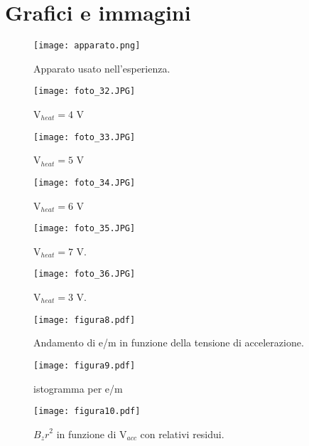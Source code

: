 \section{Grafici e immagini}

\begin{figure}[h]
	\centering
	\texttt{[image: apparato.png]}
	\caption{Apparato usato nell'esperienza.}
	\label{f:apparato}
\end{figure}
\begin{figure}[h]
	\centering
	\texttt{[image: foto\_32.JPG]}
	\caption{V$_{heat} = 4$ V}
	\label{f:figura_3}
\end{figure}
\begin{figure}[h]
	\centering
	\texttt{[image: foto\_33.JPG]}
	\caption{V$_{heat} = 5$ V}
           \label{f:figura_4}
\end{figure}
\begin{figure}[h]
	\centering
	\texttt{[image: foto\_34.JPG]}
	\caption{V$_{heat} = 6$ V}
	\label{f:figura_5}
\end{figure}
\begin{figure}[h]
	\centering
	\texttt{[image: foto\_35.JPG]}
	\caption{V$_{heat} = 7$ V.}
           \label{f:figura_6}
\end{figure}
\begin{figure}[h]
	\centering
	\texttt{[image: foto\_36.JPG]}
	\caption{V$_{heat} = 3$ V.}
           \label{f:figura_7}
\end{figure}
\begin{figure}[h]
	\centering
	\texttt{[image: figura8.pdf]}
	\caption{Andamento di e/m in funzione della tensione di accelerazione.}
	\label{f:figura_8}
\end{figure}
\begin{figure}[h]
	\centering
	\texttt{[image: figura9.pdf]}
	\caption{istogramma per e/m}
           \label{f:figura_9}
\end{figure}
\begin{figure}[h]
	\centering
	\texttt{[image: figura10.pdf]}
	\caption{${B_z r}^2$ in funzione di V$_{acc}$ con relativi residui.}
           \label{f:figura_10}
\end{figure}







